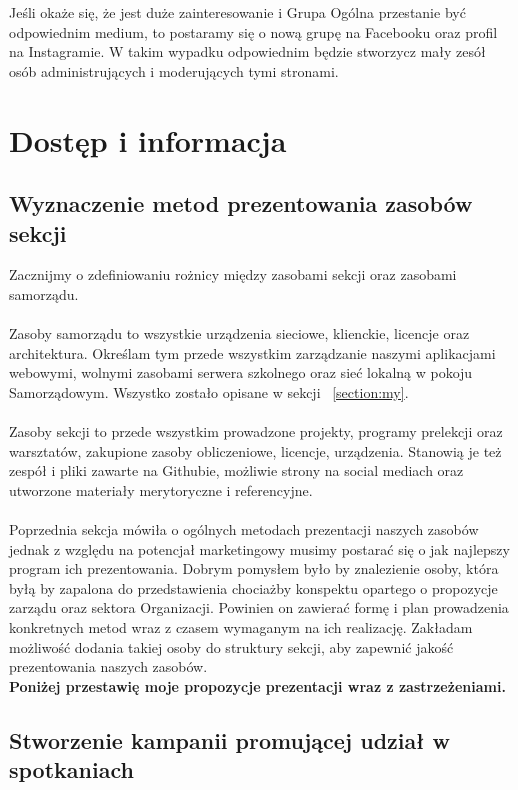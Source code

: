 \documentclass[9pt,a4paper]{report}
\begin{document}
Jeśli okaże się, że jest duże zainteresowanie i Grupa Ogólna przestanie być odpowiednim medium, to postaramy się o nową grupę na Facebooku oraz profil na Instagramie. W takim  wypadku odpowiednim będzie stworzycz mały zesół osób administrujących i moderujących tymi stronami.

\chapter{Dostęp i informacja}

\section{Wyznaczenie metod prezentowania zasobów sekcji}

Zacznijmy o zdefiniowaniu rożnicy między zasobami sekcji oraz zasobami samorządu.\\\\

Zasoby samorządu to wszystkie urządzenia sieciowe, klienckie, licencje oraz architektura. Określam tym przede wszystkim zarządzanie naszymi aplikacjami webowymi, wolnymi zasobami serwera szkolnego oraz sieć lokalną w pokoju Samorządowym. Wszystko zostało opisane w sekcji ~\ref{section:my}.\\\\

Zasoby sekcji to przede wszystkim prowadzone projekty, programy prelekcji oraz warsztatów, zakupione zasoby obliczeniowe, licencje, urządzenia. Stanowią je też zespół i pliki zawarte na Githubie, możliwie strony na social mediach oraz utworzone materiały merytoryczne i referencyjne.\\\\
Poprzednia sekcja mówiła o ogólnych metodach prezentacji naszych zasobów jednak z względu na potencjał marketingowy musimy postarać się o jak najlepszy program ich prezentowania. Dobrym pomysłem było by znalezienie osoby, która byłą by zapalona do przedstawienia chociażby konspektu opartego o propozycje zarządu oraz sektora Organizacji. Powinien on zawierać formę i plan prowadzenia konkretnych metod wraz z czasem wymaganym na ich realizację. Zakładam możliwość dodania takiej osoby do struktury sekcji, aby zapewnić jakość prezentowania naszych zasobów.\\

\textbf{Poniżej przestawię moje propozycje prezentacji wraz z zastrzeżeniami.}

\section{Stworzenie kampanii promującej udział w spotkaniach}
\end{document}
